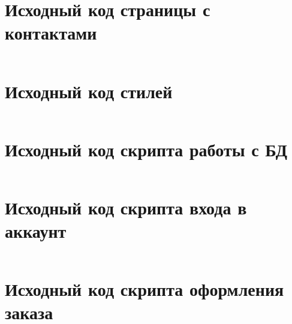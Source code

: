 \documentclass[a4paper, 14pt]{extarticle}
\newenvironment{code}{\captionsetup{type=listing}}{}
\begin{document}
\newpage

\section{Исходный код страницы с контактами}
\label{app:contacts.html}

\begin{code}
  \inputminted{html}{../task-1/contacts.html}
\end{code}

\newpage

\section{Исходный код стилей}
\label{app:style.css}

\begin{code}
  \inputminted{css}{../task-1/css/style.css}
\end{code}

\newpage

\section{Исходный код скрипта работы с БД}
\label{app:database.php}

\begin{code}
  \inputminted{php}{../task-1/database.php}
\end{code}

\newpage

\section{Исходный код скрипта входа в аккаунт}
\label{app:login.php}

\begin{code}
  \inputminted{php}{../task-1/login.php}
\end{code}

\newpage

\section{Исходный код скрипта оформления заказа}
\label{app:order.php}

\begin{code}
  \inputminted{php}{../task-1/order.php}
\end{code}
\end{document}
